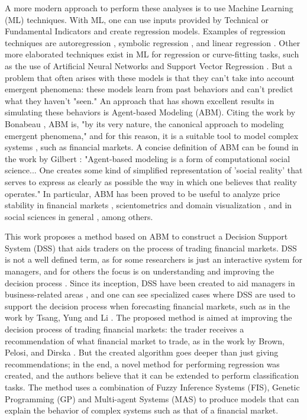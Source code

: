A more modern approach to perform these analyses is to use Machine Learning (ML) techniques. With ML, one can use inputs provided by Technical or Fundamental Indicators and create regression models. Examples of regression techniques are autoregression \cite{burg1968new}, symbolic regression \cite{billard2002symbolic}, and linear regression \cite{kutner2004applied}. Other more elaborated techniques exist in ML for regression or curve-fitting tasks, such as the use of Artificial Neural Networks \cite{melin2007hybrid} and Support Vector Regression \cite{basak2007support}. But a problem that often arises with these models is that they can't take into account emergent phenomena: these models learn from past behaviors and can't predict what they haven't "seen." An approach that has shown excellent results in simulating these behaviors is Agent-based Modeling (ABM). Citing the work by Bonabeau \cite{bonabeau2002agent}, ABM is, "by its very nature, the canonical approach to modeling emergent phenomena," and for this reason, it is a suitable tool to model complex systems \cite{jennings2001agent}, such as financial markets. A concise definition of ABM can be found in the work by Gilbert \cite{gilbert2008agent}: "Agent-based modeling is a form of computational social science... One creates some kind of simplified representation of 'social reality' that serves to express as clearly as possible the way in which one believes that reality operates." In particular, ABM has been proved to be useful to analyze price stability in financial markets \cite{Pellizzari2007}, scientometrics and domain visualization \cite{Niazi2011}, and in social sciences in general \cite{gilbert2008agent}, among others.

This work proposes a method based on ABM to construct a Decision Support System (DSS) that aids traders on the process of trading financial markets. DSS is not a well defined term, as for some researchers is just an interactive system for managers, and for others the focus is on understanding and improving the decision process \cite{keen1980decision}. Since its inception, DSS have been created to aid managers in business-related areas \cite{Sprague1980} \cite{little1979decision}, and one can see specialized cases where DSS are used to support the decision process when forecasting financial markets, such as in the work by Tsang, Yung and Li \cite{Tsang2004}. The proposed method is aimed at improving the decision process of trading financial markets: the trader receives a recommendation of what financial market to trade, as in the work by Brown, Pelosi, and Dirska \cite{brown2013dynamic}. But the created algorithm goes deeper than just giving recommendations; in the end, a novel method for performing regression was created, and the authors believe that it can be extended to perform classification tasks. The method uses a combination of Fuzzy Inference Systems (FIS), Genetic Programming (GP) \cite{poli2008field} \cite{Koza1992} and Multi-agent Systems (MAS) \cite{Shoham2009} to produce models that can explain the behavior of complex systems such as that of a financial market.

